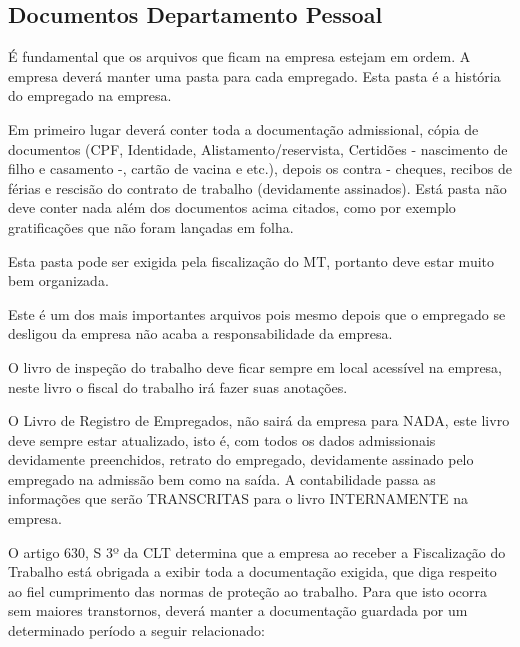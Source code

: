 \documentclass{article}
\begin{document}
\subsection{Documentos Departamento Pessoal}
\label{arquivo:pessoal}
É fundamental que os arquivos que ficam na empresa estejam em ordem. A empresa deverá manter uma pasta para cada empregado. Esta pasta é a história do empregado na empresa.

Em primeiro lugar deverá conter toda a documentação admissional, cópia de documentos (CPF, Identidade, Alistamento/reservista, Certidões - nascimento de filho e casamento -, cartão de vacina e etc.), depois os contra - cheques, recibos de férias e rescisão do contrato de trabalho (devidamente assinados). Está pasta não deve conter nada além dos documentos acima citados, como por exemplo gratificações que não foram lançadas em folha.

Esta pasta pode ser exigida pela fiscalização do MT, portanto deve estar muito bem organizada.

Este é um dos mais importantes arquivos pois mesmo depois que o empregado se desligou da empresa não acaba a responsabilidade da empresa.

O livro de inspeção do trabalho deve ficar sempre em local acessível na empresa, neste livro o fiscal do trabalho irá fazer suas anotações.

\begin{tcolorbox}[title=Atenção!]
  O Livro de Registro de Empregados, não sairá da empresa para NADA, este livro deve sempre estar atualizado, isto é, com todos os dados admissionais devidamente preenchidos, retrato do empregado, devidamente assinado pelo empregado na admissão bem como na saída. A contabilidade passa as informações que serão TRANSCRITAS para o livro INTERNAMENTE na empresa.
\end{tcolorbox}

O artigo 630, S 3º da CLT determina que a empresa ao receber a Fiscalização do Trabalho está obrigada a exibir toda a documentação exigida, que diga respeito ao fiel cumprimento das normas de proteção ao trabalho. Para que isto ocorra sem maiores transtornos, deverá manter a documentação guardada por um determinado período a seguir relacionado:
\end{document}

